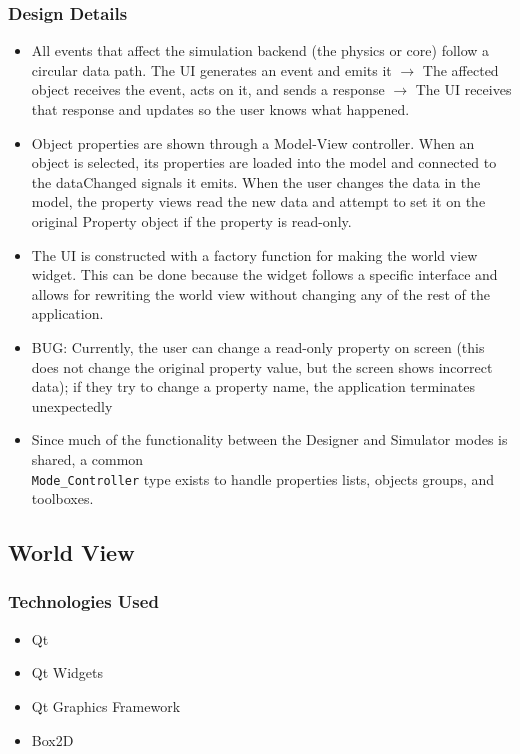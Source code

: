  \subsubsection*{Design Details}
 \begin{itemize}
 	\item All events that affect the simulation backend (the physics or core) follow a circular data path. The UI generates an event and emits it $\rightarrow$ The affected object receives the event, acts on it, and sends a response $\rightarrow$ The UI receives that response and updates so the user knows what happened.
 	\item Object properties are shown through a Model-View controller. When an object is selected, its properties are loaded into the model and connected to the dataChanged signals it emits. When the user changes the data in the model, the property views read the new data and attempt to set it on the original Property object if the property is read-only.
 	\item The UI is constructed with a factory function for making the world view widget. This can be done because the widget follows a specific interface and allows for rewriting the world view without changing any of the rest of the application.
	\item BUG: Currently, the user can change a read-only property on screen (this does not change the original property value, but the screen shows incorrect data); if they try to change a property name, the application terminates unexpectedly
	\item Since much of the functionality between the Designer and Simulator modes is shared, a common \\ \lstinline|Mode_Controller| type exists to handle properties lists, objects groups, and toolboxes.
 \end{itemize}
\subsection{World View}
\subsubsection*{Technologies Used}
\begin{itemize}
	\item Qt
	\item Qt Widgets
	\item Qt Graphics Framework
	\item Box2D
\end{itemize}
